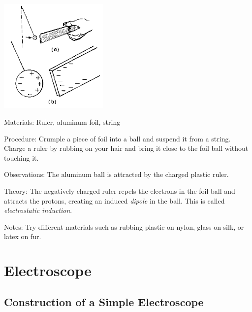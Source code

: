 \begin{multicols}{2}
\begin{center}
\includegraphics[width=0.4\textwidth]{./img/source/elec-induction.png}
\end{center}

\begin{description*}
\item[Materials:]{Ruler, aluminum foil, string}
\item[Procedure:]{Crumple a piece of foil into a ball and suspend it from a string. Charge a ruler by rubbing on your hair and bring it close to the foil ball without touching it.}
\item[Observations:]{The aluminum ball is attracted by the charged plastic ruler.}
\item[Theory:]{The negatively charged ruler repels the electrons in the foil ball and attracts the protons, creating an induced \emph{dipole} in the ball. This is called \emph{electrostatic induction}.}
\item[Notes:]{Try different materials such as rubbing plastic on nylon, glass on silk, or latex on fur.}
\end{description*}


\section*{Electroscope}

\subsection{Construction of a Simple Electroscope}


\end{multicols}
